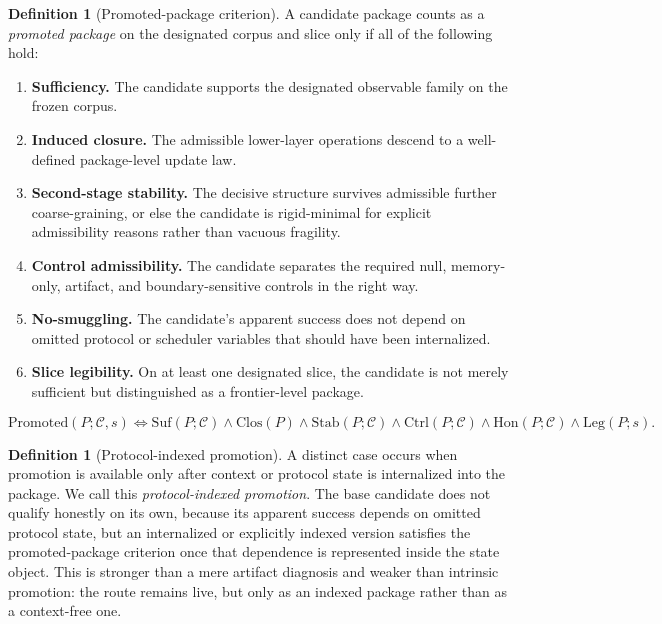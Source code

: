 \documentclass[11pt]{article}
\theoremstyle{definition}
\newtheorem{definition}[theorem]{Definition}
\begin{document}
\begin{definition}[Promoted-package criterion]\label{def:promoted-package-criterion}
A candidate package counts as a \emph{promoted package} on the designated corpus and slice only if all of the following hold:
\begin{enumerate}[label=(\roman*)]
\item \textbf{Sufficiency.} The candidate supports the designated observable family on the frozen corpus.
\item \textbf{Induced closure.} The admissible lower-layer operations descend to a well-defined package-level update law.
\item \textbf{Second-stage stability.} The decisive structure survives admissible further coarse-graining, or else the candidate is rigid-minimal for explicit admissibility reasons rather than vacuous fragility.
\item \textbf{Control admissibility.} The candidate separates the required null, memory-only, artifact, and boundary-sensitive controls in the right way.
\item \textbf{No-smuggling.} The candidate's apparent success does not depend on omitted protocol or scheduler variables that should have been internalized.
\item \textbf{Slice legibility.} On at least one designated slice, the candidate is not merely sufficient but distinguished as a frontier-level package.
\end{enumerate}
\end{definition}

\[
\mathrm{Promoted}(P;\mathcal C,s)
\iff
\mathrm{Suf}(P;\mathcal C)\wedge
\mathrm{Clos}(P)\wedge
\mathrm{Stab}(P;\mathcal C)\wedge
\mathrm{Ctrl}(P;\mathcal C)\wedge
\mathrm{Hon}(P;\mathcal C)\wedge
\mathrm{Leg}(P;s).
\]

\begin{definition}[Protocol-indexed promotion]\label{def:protocol-indexed-promotion}
A distinct case occurs when promotion is available only after context or protocol state is internalized into the package. We call this \emph{protocol-indexed promotion}. The base candidate does not qualify honestly on its own, because its apparent success depends on omitted protocol state, but an internalized or explicitly indexed version satisfies the promoted-package criterion once that dependence is represented inside the state object. This is stronger than a mere artifact diagnosis and weaker than intrinsic promotion: the route remains live, but only as an indexed package rather than as a context-free one.
\end{definition}
\end{document}
